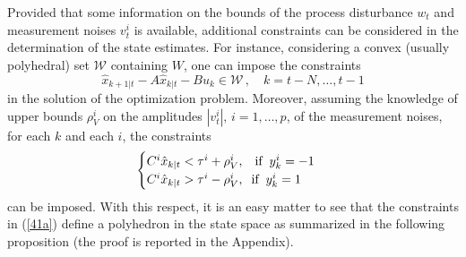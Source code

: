 \documentclass[11pt,journal,onecolumn]{IEEEtran}
\begin{document}
Provided that some information on the bounds of the process disturbance $w_t$ and measurement noises $v_t^i $ is available, additional constraints can be considered in the determination of the state estimates. For instance, considering a convex (usually polyhedral) set $\mathcal W$ containing $W$, one can impose the constraints
\begin{equation}\label{con:w}
\hat{x}_{k+1|t}-A\hat{x}_{k|t}-B u_{k} \in \mathcal W \, , \quad k = t-N, \ldots, t-1
\end{equation}
in the solution of the optimization problem.
Moreover, assuming the knowledge of upper bounds $\rho_{V}^{i}$ on the amplitudes $|v_t^i | , \, i=1, \ldots, p$, of the
measurement noises, for each $k$ and each $i$, the constraints
\begin{equation}\label{41a}
\begin{cases}
C^{i}\hat{x}_{k|t}<\tau^{i} +\rho_{V}^{i},\hspace{3mm}\text{if}\hspace{2mm}y_{k}^{i}=-1\\
C^{i}\hat{x}_{k|t}>\tau^{i} - \rho_{V}^{i},\hspace{2mm}\text{if}\hspace{2mm}y_{k}^{i}=1
\end{cases}
\end{equation}
can be imposed. With this respect, it is an easy matter to see that the constraints in (\ref{41a}) define a polyhedron in the state space as summarized in the following proposition (the proof is reported in the Appendix).
\vspace{.3 cm}
\end{document}
